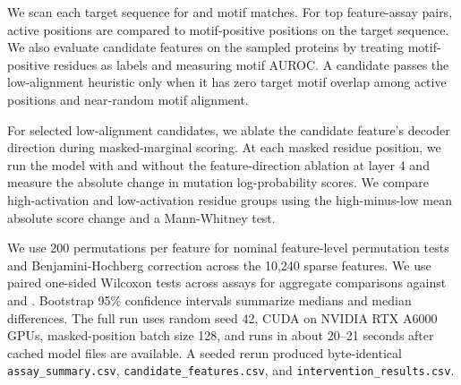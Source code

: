  We scan each target sequence for \elm and \prosite motif matches. For top feature-assay pairs, active positions are compared to motif-positive positions on the target sequence. We also evaluate candidate features on the sampled \swissprot proteins by treating motif-positive residues as labels and measuring motif AUROC. A candidate passes the low-alignment heuristic only when it has zero target motif overlap among active positions and near-random \swissprot motif alignment.

 For selected low-alignment candidates, we ablate the candidate feature's decoder direction during masked-marginal scoring. At each masked residue position, we run the model with and without the feature-direction ablation at layer 4 and measure the absolute change in mutation log-probability scores. We compare high-activation and low-activation residue groups using the high-minus-low mean absolute score change and a Mann-Whitney test.

 We use 200 permutations per feature for nominal feature-level permutation tests and Benjamini-Hochberg correction across the 10,240 sparse features. We use paired one-sided Wilcoxon tests across assays for aggregate comparisons against \rawhidden and \shuffledsae. Bootstrap 95\% confidence intervals summarize medians and median differences. The full run uses random seed 42, CUDA on NVIDIA RTX A6000 GPUs, masked-position batch size 128, and runs in about 20--21 seconds after cached model files are available. A seeded rerun produced byte-identical \texttt{assay\_summary.csv}, \texttt{candidate\_features.csv}, and \texttt{intervention\_results.csv}.
